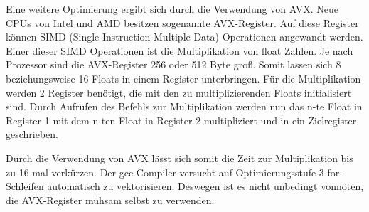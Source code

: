 \documentclass[../main.tex]{subfiles}
\begin{document}
Eine weitere Optimierung ergibt sich durch die Verwendung von AVX. Neue CPUs von Intel und AMD besitzen sogenannte AVX-Register. Auf diese Register können SIMD (Single Instruction Multiple Data) Operationen angewandt werden. Einer dieser SIMD Operationen ist die Multiplikation von float Zahlen.
Je nach Prozessor sind die AVX-Register 256 oder 512 Byte groß. Somit lassen sich 8 beziehungsweise 16 Floats in einem Register unterbringen. Für die Multiplikation werden 2 Register benötigt, die mit den zu multiplizierenden Floats initialisiert sind. Durch Aufrufen des Befehls zur Multiplikation werden nun das n-te Float in Register 1 mit dem n-ten Float in Register 2 multipliziert und in ein Zielregister geschrieben.

Durch die Verwendung von AVX lässt sich somit die Zeit zur Multiplikation bis zu 16 mal verkürzen. Der gcc-Compiler versucht auf Optimierungsstufe 3 for-Schleifen automatisch zu vektorisieren. Deswegen ist es nicht unbedingt vonnöten, die AVX-Register mühsam selbst zu verwenden. 
\end{document}
